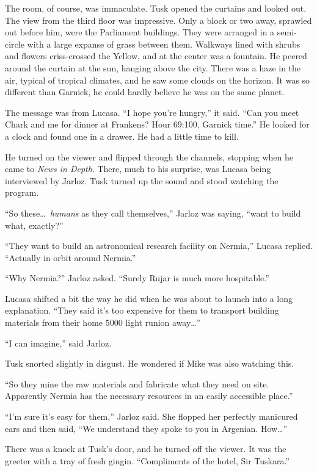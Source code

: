 The room, of course, was immaculate. Tusk opened the curtains and looked out. The view from the
third floor was impressive. Only a block or two away, sprawled out before him, were the
Parliament buildings. They were arranged in a semi-circle with a large expanse of grass between
them. Walkways lined with shrubs and flowers criss-crossed the Yellow, and at the center was a
fountain. He peered around the curtain at the sun, hanging above the city. There was a haze in
the air, typical of tropical climates, and he saw some clouds on the horizon. It was so
different than Garnick, he could hardly believe he was on the same planet.

The message was from Lucasa. ``I hope you're hungry,'' it said. ``Can you meet Chark and me for
dinner at Frankens? Hour 69:100, Garnick time.'' He looked for a clock and found one in a
drawer. He had a little time to kill.

He turned on the viewer and flipped through the channels, stopping when he came to \textit{News
  in Depth}. There, much to his surprise, was Lucasa being interviewed by Jarloz. Tusk turned up
the sound and stood watching the program.

``So these\ldots\ \textit{humans} as they call themselves,'' Jarloz was saying, ``want to build
what, exactly?''

``They want to build an astronomical research facility on Nermia,'' Lucasa replied. ``Actually
in orbit around Nermia.''

``Why Nermia?'' Jarloz asked. ``Surely Rujar is much more hospitable.''

Lucasa shifted a bit the way he did when he was about to launch into a long explanation. ``They
said it's too expensive for them to transport building materials from their home 5000 light
runion away\ldots''

``I can imagine,'' said Jarloz.

Tusk snorted slightly in disgust. He wondered if Mike was also watching this.

``So they mine the raw materials and fabricate what they need on site. Apparently Nermia has the
necessary resources in an easily accessible place.''

``I'm sure it's easy for them,'' Jarloz said. She flopped her perfectly manicured ears and then
said, ``We understand they spoke to you in Argenian. How\ldots''

There was a knock at Tusk's door, and he turned off the viewer. It was the greeter with a tray
of fresh gingin. ``Compliments of the hotel, Sir Tuskara.''

